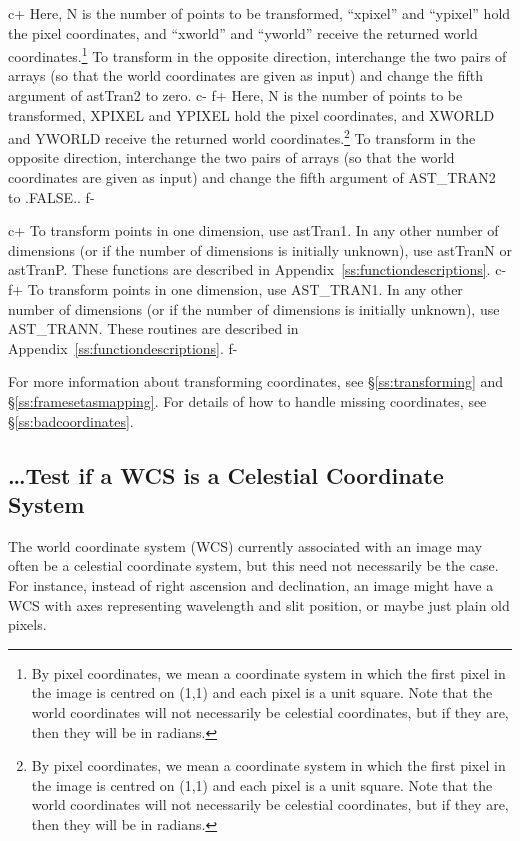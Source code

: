 \documentclass[twoside,11pt]{starlink}
\providecommand{\appref}[1]{Appendix~\ref{#1}}
\providecommand{\secref}[1]{\S\ref{#1}}
\begin{document}
c+
Here, N is the number of points to be transformed, ``xpixel'' and
``ypixel'' hold the pixel coordinates, and ``xworld'' and ``yworld''
receive the returned world coordinates.\footnote{By pixel coordinates,
we mean a coordinate system in which the first pixel in the image is
centred on (1,1) and each pixel is a unit square.  Note that the world
coordinates will not necessarily be celestial coordinates, but if they
are, then they will be in radians.}  To transform in the opposite
direction, interchange the two pairs of arrays (so that the world
coordinates are given as input) and change the fifth argument of
astTran2 to zero.
c-
f+
Here, N is the number of points to be transformed, XPIXEL and YPIXEL
hold the pixel coordinates, and XWORLD and YWORLD receive the returned
world coordinates.\footnote{By pixel coordinates, we mean a coordinate
system in which the first pixel in the image is centred on (1,1) and
each pixel is a unit square.  Note that the world coordinates will not
necessarily be celestial coordinates, but if they are, then they will
be in radians.}  To transform in the opposite direction, interchange
the two pairs of arrays (so that the world coordinates are given as
input) and change the fifth argument of AST\_TRAN2 to .FALSE..
f-

c+
To transform points in one dimension, use astTran1. In any other
number of dimensions (or if the number of dimensions is initially
unknown), use astTranN or astTranP. These functions are described in
\appref{ss:functiondescriptions}.
c-
f+
To transform points in one dimension, use AST\_TRAN1. In any other
number of dimensions (or if the number of dimensions is initially
unknown), use AST\_TRANN. These routines are described in
\appref{ss:functiondescriptions}.
f-

For more information about transforming coordinates, see
\secref{ss:transforming} and \secref{ss:framesetasmapping}. For
details of how to handle missing coordinates, see
\secref{ss:badcoordinates}.

\subsection{\label{ss:howtotestforcelestial}\ldots Test if a WCS is a Celestial Coordinate System}

The world coordinate system (WCS) currently associated with an image
may often be a celestial coordinate system, but this need not
necessarily be the case. For instance, instead of right ascension and
declination, an image might have a WCS with axes representing
wavelength and slit position, or maybe just plain old pixels.
\end{document}
